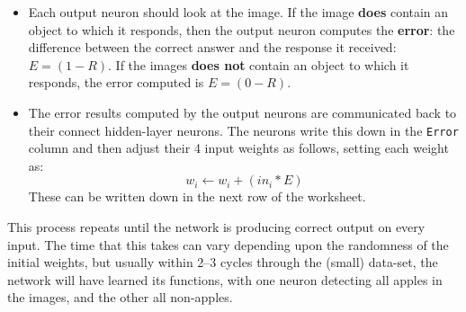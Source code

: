 \documentclass[leqno,11pt]{article}
\begin{document}
\begin{enumerate}
\begin{itemize}
		\item Each output neuron should look at the image.  If the image \textbf{does} contain
				an object to which it responds, then the output neuron 
				computes the \textbf{error}:  the difference between the correct answer and the
				response it received: $E = (1- R)$.  If the images \textbf{does not} contain an
				object to which it responds, the error computed is $E = (0-R)$.

		\item The error results computed by the output neurons are communicated back to their connect
			hidden-layer neurons.  The neurons write this down in the \texttt{Error} column and then
			adjust their 4 input weights as follows, setting each weight as:
			\[
				w_i \leftarrow w_i + (in_i * E)
			\]
			These can be written down in the next row of the worksheet.
		\end{itemize}
	This process repeats until the network is producing correct output on every input.  The time that this
	takes can vary depending upon the randomness of the initial weights, but usually within 2--3 cycles
	through the (small) data-set, the network will have learned its functions, with one neuron detecting all
	apples in the images, and the other all non-apples.

\end{enumerate} 
\end{document}
